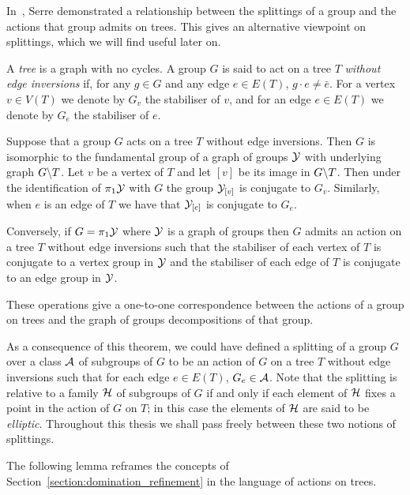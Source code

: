 In~\cite{serre77}, Serre demonstrated a relationship between the splittings of a group and the actions that group admits on trees.
This gives an alternative viewpoint on splittings, which we will find useful later on.

\begin{definition}
  A \emph{tree} is a graph with no cycles.
  A group $G$ is said to act on a tree $T$ \emph{without edge inversions} if, for any $g \in G$ and any edge $e \in E(T)$, $g\cdot e \neq \bar{e}$.
  For a vertex $v \in V(T)$ we denote by $G_v$ the stabiliser of $v$, and for an edge $e \in E(T)$ we denote by $G_e$ the stabiliser of $e$.
\end{definition}

\begin{theorem}\cite{serre77}
  Suppose that a group $G$ acts on a tree $T$ without edge inversions.
  Then $G$ is isomorphic to the fundamental group of a graph of groups $\mathcal{Y}$ with underlying graph $G \backslash T$.
  Let $v$ be a vertex of $T$ and let $[v]$ be its image in $G \backslash T$. 
  Then under the identification of $\pi_1\mathcal{Y}$ with $G$ the group $\mathcal{Y}_{[v]}$ is conjugate to $G_v$.
  Similarly, when $e$ is an edge of $T$ we have that $\mathcal{Y}_{[e]}$ is conjugate to $G_e$.

  Conversely, if $G = \pi_1\mathcal{Y}$ where $\mathcal{Y}$ is a graph of groups then $G$ admits an action on a tree $T$ without edge inversions such that the stabiliser of each vertex of $T$ is conjugate to a vertex group in $\mathcal{Y}$ and the stabiliser of each edge of $T$ is conjugate to an edge group in $\mathcal{Y}$.

  These operations give a one-to-one correspondence between the actions of a group on trees and the graph of groups decompositions of that group.
\end{theorem}

As a consequence of this theorem, we could have defined a splitting of a group $G$ over a class $\mathcal{A}$ of subgroups of $G$ to be an action of $G$ on a tree $T$ without edge inversions such that for each edge $e \in E(T)$, $G_e \in \mathcal{A}$.
Note that the splitting is relative to a family $\mathcal{H}$ of subgroups of $G$ if and only if each element of $\mathcal{H}$ fixes a point in the action of $G$ on $T$; in this case the elements of $\mathcal{H}$ are said to be \emph{elliptic}.
Throughout this thesis we shall pass freely between these two notions of splittings.

The following lemma reframes the concepts of Section~\ref{section:domination_refinement} in the language of actions on trees.

